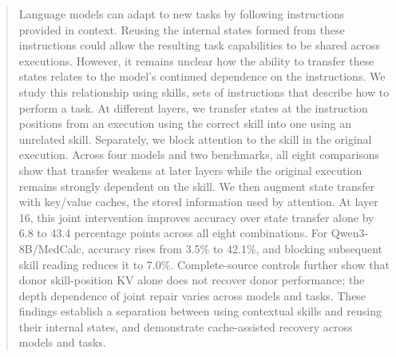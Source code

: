 \begin{abstract}
Language models can adapt to new tasks by following instructions provided in context.
Reusing the internal states formed from these instructions could allow the resulting task capabilities to be shared across executions.
However, it remains unclear how the ability to transfer these states relates to the model’s continued dependence on the instructions.
We study this relationship using skills, sets of instructions that describe how to perform a task.
At different layers, we transfer states at the instruction positions from an execution using the correct skill into one using an unrelated skill.
Separately, we block attention to the skill in the original execution.
Across four models and two benchmarks, all eight comparisons show that transfer weakens at later layers while the original execution remains strongly dependent on the skill.
We then augment state transfer with key/value caches, the stored information used by attention.
At layer 16, this joint intervention improves accuracy over state transfer alone by 6.8 to 43.4 percentage points across all eight combinations.
For Qwen3-8B/MedCalc, accuracy rises from 3.5\% to 42.1\%, and blocking subsequent skill reading reduces it to 7.0\%.
Complete-source controls further show that donor skill-position KV alone does not recover donor performance; the depth dependence of joint repair varies across models and tasks.
These findings establish a separation between using contextual skills and reusing their internal states, and demonstrate cache-assisted recovery across models and tasks.
\end{abstract}

